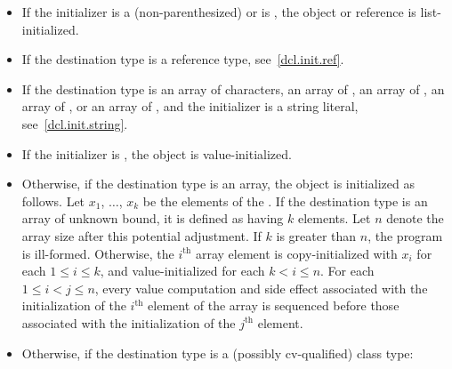 \begin{itemize}
\item
If the initializer is a (non-parenthesized) 
or is \tcode{=} , the object or reference
is list-initialized.
\item
If the destination type is a reference type, see~\ref{dcl.init.ref}.
\item
If the destination type is an array of characters,
an array of ,
an array of ,
an array of ,
or an array of
,
and the initializer is a string literal, see~\ref{dcl.init.string}.
\item If the initializer is \tcode{()}, the object is value-initialized.
\item
Otherwise, if the destination type is an array,
the object is initialized as follows.
Let $x_1$, $\dotsc$, $x_k$ be
the elements of the .
If the destination type is an array of unknown bound,
it is defined as having $k$ elements.
Let $n$ denote the array size after this potential adjustment.
If $k$ is greater than $n$,
the program is ill-formed.
Otherwise, the $i^\text{th}$ array element is copy-initialized with
$x_i$ for each $1 \leq i \leq k$, and
value-initialized for each $k < i \leq n$.
For each $1 \leq i < j \leq n$,
every value computation and side effect associated with
the initialization of the $i^\text{th}$ element of the array
is sequenced before those associated with
the initialization of the $j^\text{th}$ element.
\item
Otherwise, if the destination type is a (possibly cv-qualified) class type:


\end{itemize}
